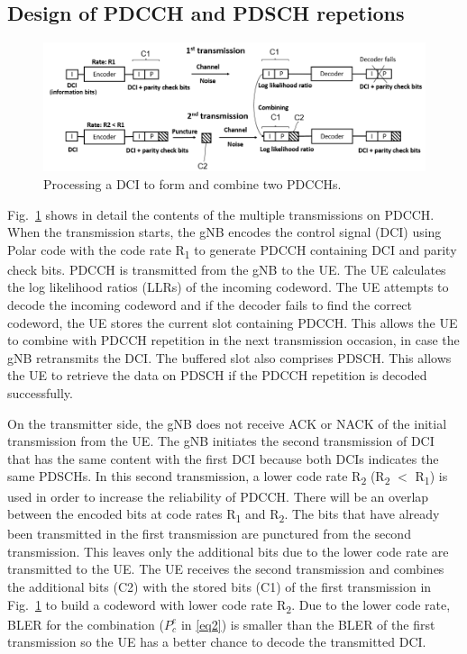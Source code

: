 \documentclass[conference]{IEEEtran}
\begin{document}
\subsection{Design of PDCCH and PDSCH repetions}\label{BB}
\begin{figure}[htbp]
\centerline{\includegraphics[scale=0.35]{fig3.png}}
\caption{Processing a DCI to form and combine two PDCCHs.}
\label{fig3}
\end{figure}

Fig.~\ref{fig3} shows in detail the contents of the multiple transmissions on PDCCH. When the transmission starts, the gNB encodes the control signal (DCI) using Polar code with the code rate R\textsubscript{1} to generate PDCCH containing DCI and parity check bits. PDCCH is transmitted from the gNB to the UE. The UE calculates the log likelihood ratios (LLRs) of the incoming codeword. The UE attempts to decode the incoming codeword and if the decoder fails to find the correct codeword, the UE stores the current slot containing PDCCH. This allows the UE to combine with PDCCH repetition in the next transmission occasion, in case the gNB retransmits the DCI. The buffered slot also comprises PDSCH. This allows the UE to retrieve the data on PDSCH if the PDCCH repetition is decoded successfully.

On the transmitter side, the gNB does not receive ACK or NACK of the initial transmission from the UE. The gNB initiates the second transmission of DCI that has the same content with the first
DCI because both DCIs indicates the same PDSCHs. In this second transmission, a lower code rate R\textsubscript{2} (R\textsubscript{2} $<$ R\textsubscript{1}) is used in order to increase the reliability of PDCCH. There will be an overlap
between the encoded bits at code rates R\textsubscript{1} and R\textsubscript{2}. The bits that have already been transmitted in the first transmission are punctured from the second transmission. This leaves only the additional bits due to the lower code rate are transmitted to the UE. The UE receives the second transmission and combines the additional bits (C2) with the stored bits (C1) of the first transmission in Fig.~\ref{fig3} to build a codeword with lower code rate R\textsubscript{2}. Due to the lower code rate, BLER for the combination ($P^{e}_{c}$ in \eqref{eq2}) is smaller than the BLER of the first transmission so the UE has a better chance to decode the transmitted DCI.
\end{document}
